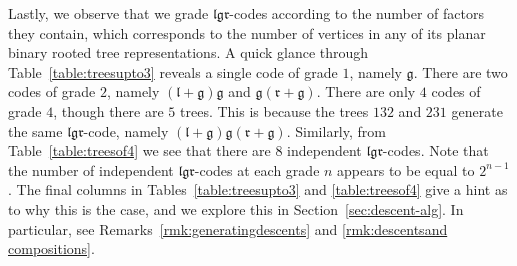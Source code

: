 \documentclass[5p,twocolumn]{elsarticle}
\newcommand*{\el}{\mathfrak l}
\newcommand*{\gl}{\mathfrak g}
\newcommand*{\rl}{\mathfrak r}
\begin{document}
Lastly, we observe that we grade $\el\gl\rl$-codes according to the number of factors they contain, which corresponds to the number of vertices in any of its planar binary rooted tree representations. 
A quick glance through Table~\ref{table:treesupto3} reveals a single code of grade $1$, namely $\gl$. There are two codes of grade $2$, namely $(\el+\gl)\gl$ and $\gl(\rl+\gl)$.
There are only $4$ codes of grade $4$, though there are $5$ trees. This is because the trees $132$ and $231$ generate the same $\el\gl\rl$-code, namely $(\el+\gl)\gl(\rl+\gl)$.
Similarly, from Table~\ref{table:treesof4} we see that there are $8$ independent $\el\gl\rl$-codes.
Note that the number of independent $\el\gl\rl$-codes at each grade $n$ appears to be equal to $2^{n-1}$. 
The final columns in Tables~\ref{table:treesupto3} and \ref{table:treesof4} give a hint as to why this is the case, and we explore this in Section~\ref{sec:descent-alg}.
In particular, see Remarks~\ref{rmk:generatingdescents} and \ref{rmk:descentsand compositions}.
\end{document}
